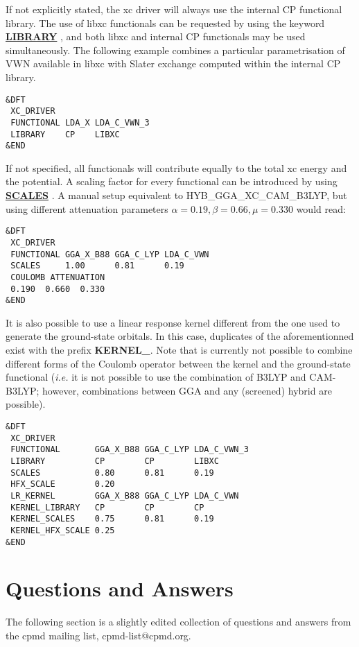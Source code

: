 \documentclass[twoside,10pt,titlepage,a4paper]{article}
\newcommand{\referto}[2]{\hyperlink{#1}{#2}}
\newcommand{\referto}[2]{\htmlref{#2}{#1}}
\newcommand{\refkeyword}[1]{%
\referto{#1}{\textbf{#1}}%
\index{#1}%
}%
\begin{document}
If not explicitly stated, the xc driver will always use the internal CP functional library. The use of 
libxc functionals can be requested by using the keyword \refkeyword{LIBRARY}, and both libxc and internal
CP functionals may be used simultaneously. The following example combines a particular parametrisation of VWN
available in libxc with Slater exchange computed within the internal CP library.
\begin{verbatim}
&DFT
 XC_DRIVER
 FUNCTIONAL LDA_X LDA_C_VWN_3
 LIBRARY    CP    LIBXC
&END
\end{verbatim}
If not specified, all functionals will contribute equally to the total xc energy and the potential. A scaling factor
for every functional can be introduced by using \refkeyword{SCALES}. A manual setup equivalent to
HYB\_GGA\_XC\_CAM\_B3LYP, but using different attenuation parameters $\alpha=0.19, \beta=0.66, \mu=0.330$ would read:
\begin{verbatim}
&DFT
 XC_DRIVER
 FUNCTIONAL GGA_X_B88 GGA_C_LYP LDA_C_VWN
 SCALES     1.00      0.81      0.19
 COULOMB ATTENUATION
 0.190  0.660  0.330
&END
\end{verbatim}

It is also possible to use a linear response kernel different from the one used to generate the ground-state orbitals.
In this case, duplicates of the aforementionned exist with the prefix \textbf{KERNEL\_}.
Note that is currently not possible to combine different forms of the Coulomb operator between the kernel and the ground-state
functional (\emph{i.e.{}} it is not possible to use the combination of B3LYP and CAM-B3LYP; however, combinations between GGA and any
(screened) hybrid are possible).
\begin{verbatim}
&DFT
 XC_DRIVER
 FUNCTIONAL       GGA_X_B88 GGA_C_LYP LDA_C_VWN_3
 LIBRARY          CP        CP        LIBXC 
 SCALES           0.80      0.81      0.19
 HFX_SCALE        0.20
 LR_KERNEL        GGA_X_B88 GGA_C_LYP LDA_C_VWN
 KERNEL_LIBRARY   CP        CP        CP
 KERNEL_SCALES    0.75      0.81      0.19
 KERNEL_HFX_SCALE 0.25
&END
\end{verbatim}


\clearpage
\section{Questions and Answers}\label{faq}

The following section is a slightly edited collection of questions and
answers from the cpmd mailing list, cpmd-list@cpmd.org.
\end{document}
